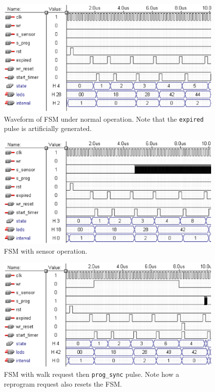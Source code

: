 \documentclass[12pt]{article}
\begin{document}
	\begin{figure}[h]
	\centering
	\includegraphics[scale=0.40]{sim1.ps}
	\caption{Waveform of FSM under normal operation.  Note that the \texttt{expired} pulse is artificially generated.}
	\label{fig:sim1}
	\end{figure}

	\begin{figure}[h]
	\centering
	\includegraphics[scale=0.40]{sim2.ps}
	\caption{FSM with sensor operation.}
	\label{fig:sim2}
	\end{figure}

	\begin{figure}[h]
	\centering
	\includegraphics[scale=0.40]{sim3.ps}
	\caption{FSM with walk request then \texttt{prog\_sync} pulse.  Note how a reprogram request also resets the FSM.}
	\label{fig:sim3}
	\end{figure}
\end{document}
